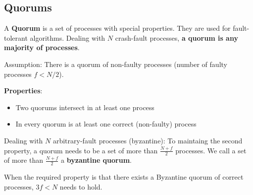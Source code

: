 \documentclass[12pt,A4]{extarticle}
\newcommand{\highlight}[1]{\textcolor{highlightColor}{\textbf{#1}}}
\begin{document}
\subsection{Quorums}
A \highlight{Quorum} is a set of processes with special properties. They are used for fault-tolerant algorithms. Dealing with $N$ crash-fault processes, \textbf{a quorum is any majority of processes}.\par
Assumption: There is a quorum of non-faulty processes (number of faulty processes $f < N/2$).\par
\textbf{Properties}:
\begin{itemize}
  \item{Two quorums intersect in at least one process}
  \item{In every quorum is at least one correct (non-faulty) process}
\end{itemize}
Dealing with $N$ arbitrary-fault processes (byzantine): To maintaing the second property, a quorum needs to be a set of more than $\frac{N+f}{2}$ processes. We call a set of more than $\frac{N+f}{2}$ a \highlight{byzantine quorum}.\par
When the required property is that there exists a Byzantine quorum of correct processes, $3f < N$ needs to hold.

\newpage


\end{document}
